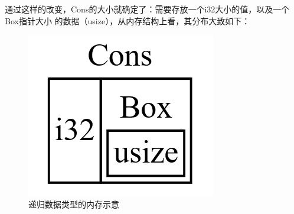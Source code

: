 通过这样的改变，Cons的大小就确定了：需要存放一个i32大小的值，以及一个Box指针大小
的数据（usize），从内存结构上看，其分布大致如下：
\begin{figure}[H]
  \centering
  \includegraphics[scale=0.4]{rust_box.png}
  \caption{递归数据类型的内存示意}
  \label{fig:rust_box}
\end{figure}

